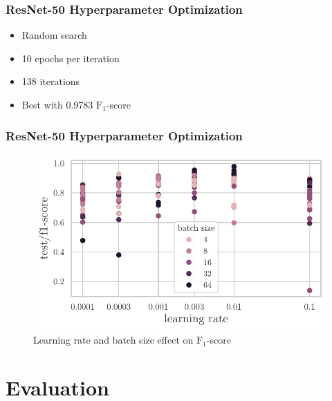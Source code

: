 \documentclass{beamer}
\begin{document}
\begin{frame}
  \frametitle{ResNet-50 Hyperparameter Optimization}
  \begin{itemize}
    \setlength{\itemsep}{1.1\baselineskip}
  \item Random search \pause
  \item 10 epochs per iteration \pause
  \item 138 iterations \pause
  \item Best with 0.9783 $\mathrm{F}_{1}$-score 
  \end{itemize}
\end{frame}

\begin{frame}
  \frametitle{ResNet-50 Hyperparameter Optimization}
  \begin{figure}[htbp]
    \centerline{\includegraphics[width=\textwidth]{graphics/classifier-hyp-metrics.pdf}}
    \caption{\normalsize Learning rate and batch size effect on
      $\mathrm{F}_{1}$-score}
  \end{figure}
\end{frame}

\section{Evaluation}
\end{document}
